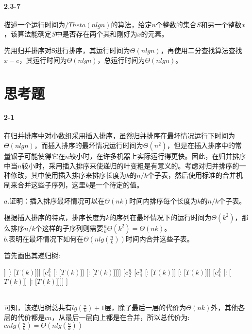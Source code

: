 \documentclass[a4paper,11pt]{article}
\begin{document}
\paragraph*{2.3-7}
描述一个运行时间为$/Theta(nlgn)$的算法，给定$n$个整数的集合$S$和另一个整数$x$，该算法能确定$S$中是否存在两个其和刚好为$x$的元素。

先用归并排序对S进行排序，其运行时间为$\Theta(nlgn)$，再使用二分查找算法查找$x-e$，其运行时间为$\Theta(nlgn)$，总运行时间为$\Theta(nlgn)$。

\section*{思考题}
\paragraph*{2-1}
在归并排序中对小数组采用插入排序，虽然归并排序在最坏情况运行下时间为$\Theta(nlgn)$，而插入排序的最坏情况运行时间为$\Theta(n^2)$，但是在插入排序中的常量银子可能使得它在$n$较小时，在许多机器上实际运行得更快。因此，在归并排序中当$n$较小时，采用插入排序来使递归的叶变粗是有意义的。考虑对归并排序的一种修改，其中使用插入排序来排序长度为$k$的$n/k$个子表，然后使用标准的合并机制来合并这些子序列，这里$k$是一个待定的值。

$a.$证明：插入排序最坏情况可以在$\Theta(nk)$时间内排序每个长度为$k$的$n/k$个子表。

根据插入排序的特点，排序长度为$k$的序列在最坏情况下的运行时间为$\Theta(k^2)$，那么排序$n/k$个这样的子序列则需要$\frac{n}{k}\Theta(k^2)=\Theta(nk)$。\\
$b.$表明在最坏情况下如何在$\Theta(nlg(\frac{n}{k}))$时间内合并这些子表。

首先画出其递归树:

\begin{forest}
[$cn$
	[$c\frac{n}{2}$ [$c\frac{n}{4}$ [$\vdots$ [$T(k)$]] [$\vdots$ [$T(k)$]]] [$c\frac{k}{4}$ [$\vdots$ [$T(k)$]] [$\vdots$ [$T(k)$]]]]
	[$c\frac{n}{2}$ [$c\frac{n}{4}$ [$\vdots$ [$T(k)$]] [$\vdots$ [$T(k)$]]] [$c\frac{k}{4}$ [$\vdots$ [$T(k)$]] [$\vdots$ [$T(k)$]]]]
]
\end{forest}\\
可知，该递归树总共有$lg(\frac{n}{k})+1$层，除了最后一层的代价为$\Theta(nk)$外，其他各层的代价都是$cn$，从最后一层向上都是在合并，所以总代价为:$cnlg(\frac{n}{k})=\Theta(nlg(\frac{n}{k}))$
\end{document}

